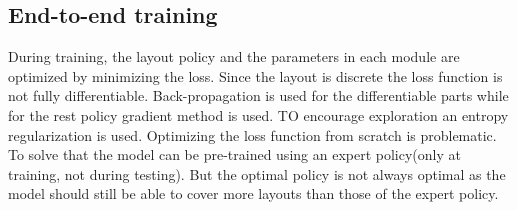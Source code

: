 \documentclass{article}
\begin{document}
	\subsection{End-to-end training}
	During training, the layout policy and the parameters in each module are optimized by minimizing the loss. Since the layout is discrete the loss function is not fully differentiable. Back-propagation is used for the differentiable parts while for the rest policy gradient method is used. TO encourage exploration an entropy regularization is used.
	Optimizing the loss function from scratch is problematic. To solve that the model can be pre-trained using an expert policy(only at training, not during testing). But the optimal policy is not always optimal as the model should still be able to cover more layouts than those of the expert policy.
	
	
	
	
	
	
\end{document}
